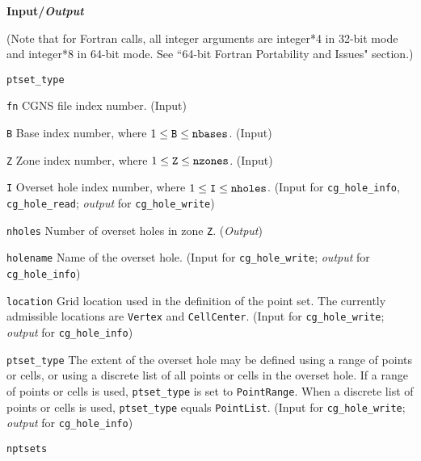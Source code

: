 \noindent
\textbf{\textcolor{input}{Input}/\textcolor{output}{\textit{Output}}}

\noindent (Note that for Fortran calls, all integer arguments are integer*4 in 32-bit mode and integer*8 in 64-bit mode.
See ``64-bit Fortran Portability and Issues" section.)

\begin{Ventryi}{\texttt{ptset\_type}}\raggedright
\item [\texttt{fn}]
      CGNS file index number.
      (\textcolor{input}{Input})
\item [\texttt{B}]
      Base index number, where $1 \leq \text{\texttt{B}} \leq \text{\texttt{nbases}}$.
      (\textcolor{input}{Input})
\item [\texttt{Z}]
      Zone index number, where $1 \leq \text{\texttt{Z}} \leq \text{\texttt{nzones}}$.
      (\textcolor{input}{Input})
\item [\texttt{I}]
      Overset hole index number, where $1 \leq \text{\texttt{I}} \leq \text{\texttt{nholes}}$.
      (\textcolor{input}{Input} for \texttt{cg\_hole\_info},
      \texttt{cg\_hole\_read};
      \textcolor{output}{\textit{output}} for \texttt{cg\_hole\_write})
\item [\texttt{nholes}]
      Number of overset holes in zone \texttt{Z}.
      (\textcolor{output}{\textit{Output}})
\item [\texttt{holename}]
      Name of the overset hole.
      (\textcolor{input}{Input} for \texttt{cg\_hole\_write};
      \textcolor{output}{\textit{output}} for \texttt{cg\_hole\_info})
\item [\texttt{location}]
      Grid location used in the definition of the point set.
      The currently admissible locations are \texttt{Vertex} and
      \texttt{CellCenter}.
      (\textcolor{input}{Input} for \texttt{cg\_hole\_write};
      \textcolor{output}{\textit{output}} for \texttt{cg\_hole\_info})
\item [\texttt{ptset\_type}]
      The extent of the overset hole may be defined using a range of
      points or cells, or using a discrete list of all points or cells
      in the overset hole.
      If a range of points or cells is used, \texttt{ptset\_type} is set
      to \texttt{PointRange}.
      When a discrete list of points or cells is used,
      \texttt{ptset\_type} equals \texttt{PointList}.
      (\textcolor{input}{Input} for \texttt{cg\_hole\_write};
      \textcolor{output}{\textit{output}} for \texttt{cg\_hole\_info})
\item [\texttt{nptsets}]

\end{Ventryi}
